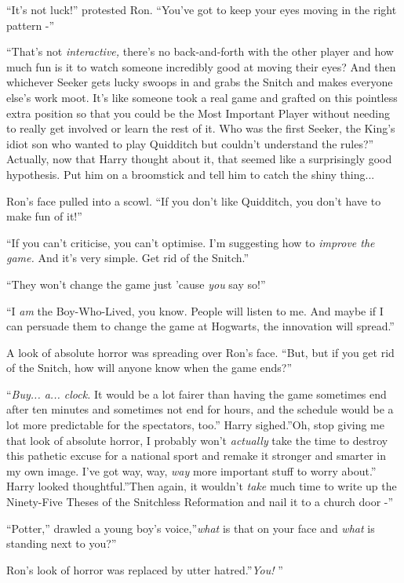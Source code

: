 ``It's not luck!'' protested Ron. ``You've got to keep your eyes moving
in the right pattern -''

``That's not \emph{interactive,} there's no back-and-forth with the other
player and how much fun is it to watch someone incredibly good at moving
their eyes? And then whichever Seeker gets lucky swoops in and grabs the
Snitch and makes everyone else's work moot. It's like someone took a
real game and grafted on this pointless extra position so that you could
be the Most Important Player without needing to really get involved or
learn the rest of it. Who was the first Seeker, the King's idiot son who
wanted to play Quidditch but couldn't understand the rules?'' Actually,
now that Harry thought about it, that seemed like a surprisingly good
hypothesis. Put him on a broomstick and tell him to catch the shiny
thing...

Ron's face pulled into a scowl. ``If you don't like Quidditch, you don't
have to make fun of it!''

``If you can't criticise, you can't optimise. I'm suggesting how to
\emph{improve the game.} And it's very simple. Get rid of the Snitch.''

``They won't change the game just 'cause \emph{you} say so!''

``I \emph{am} the Boy-Who-Lived, you know. People will listen to me. And
maybe if I can persuade them to change the game at Hogwarts, the
innovation will spread.''

A look of absolute horror was spreading over Ron's face. ``But, but if
you get rid of the Snitch, how will anyone know when the game ends?''

``\emph{Buy... a... clock.} It would be a lot fairer than
having the game sometimes end after ten minutes and sometimes not end
for hours, and the schedule would be a lot more predictable for the
spectators, too.'' Harry sighed.''Oh, stop giving me that look of
absolute horror, I probably won't \emph{actually} take the time to
destroy this pathetic excuse for a national sport and remake it stronger
and smarter in my own image. I've got way, way, \emph{way} more
important stuff to worry about.'' Harry looked thoughtful.''Then again,
it wouldn't \emph{take} much time to write up the Ninety-Five Theses of
the Snitchless Reformation and nail it to a church door -''

``Potter,'' drawled a young boy's voice,''\emph{what} is that on your
face and \emph{what} is standing next to you?''

Ron's look of horror was replaced by utter hatred.''\emph{You!} ''

